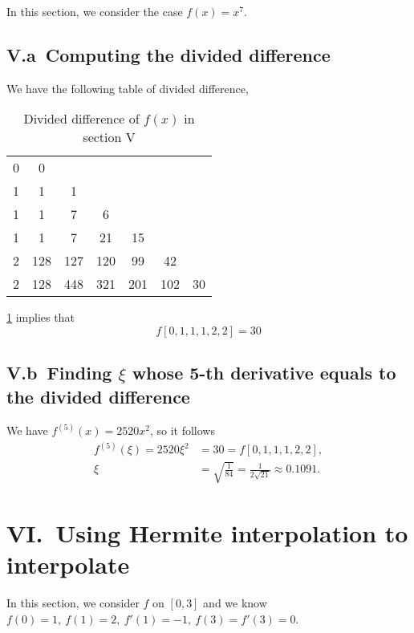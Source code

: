 \documentclass[a4paper]{article}
\renewcommand\arraystretch{1.8}
\begin{document}
In this section, we consider the case $f(x) = x^7$.

\subsection*{V.a\ Computing the divided difference}

We have the following table of divided difference,
\begin{table}[htbp]
  \centering
  \renewcommand{\arraystretch}{0.9}
  \begin{tabular}{c|cccccc}
    0 & 0 & & & & & \\
    1 & 1 & 1 & & & & \\
    1 & 1 & 7 & 6 & & & \\
    1 & 1 & 7 & 21 & 15 & & \\
    2 & 128 & 127 & 120 & 99 & 42 & \\
    2 & 128 & 448 & 321 & 201 & 102 & 30 \\
  \end{tabular}
  \caption{Divided difference of $f(x)$ in section V}
  \label{tb:v_div_diff}
  \renewcommand{\arraystretch}{1.0}
\end{table}

\cref{tb:v_div_diff} implies that 
\begin{equation}
  f[0, 1, 1, 1, 2, 2] = 30
  \label{eq:v_a_result}
\end{equation}

\subsection*{V.b\ Finding $\xi$ whose 5-th derivative equals to the divided difference}

We have $f^{(5)}(x) = 2520x^2$, so it follows
\begin{equation}
  \begin{aligned}
    f^{(5)}(\xi) = 2520\xi^2 &= 30 = f[0, 1, 1, 1, 2, 2],\\
    \xi &= \sqrt{\frac{1}{84}} = \frac{1}{2\sqrt{21}} \approx 0.1091.
  \end{aligned}
  \label{eq:v_b_result}
\end{equation}

\section*{VI.\ Using Hermite interpolation to interpolate}

In this section, we consider $f$ on $[0, 3]$ and we know $f(0) = 1,\ f(1) = 2,\ f'(1) = -1,\ f(3) = f'(3) = 0$.
\end{document}
